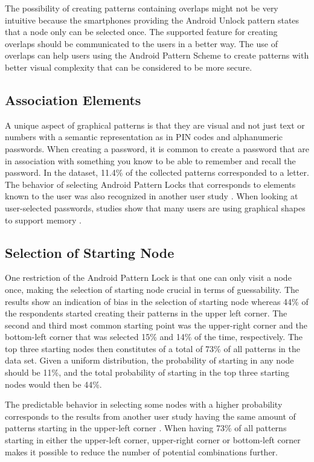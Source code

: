       The possibility of creating patterns containing overlaps might not be very intuitive because the smartphones providing the Android Unlock pattern states that a node only can be selected once. The supported feature for creating overlaps should be communicated to the users in a better way. The use of overlaps can help users using the Android Pattern Scheme to create patterns with better visual complexity that can be considered to be more secure.
    
    \clearpage
    \subsection{Association Elements}
      A unique aspect of graphical patterns is that they are visual and not just text or numbers with a semantic representation as in PIN codes and alphanumeric passwords. When creating a password, it is common to create a password that are in association with something you know to be able to remember and recall the password. In the dataset, 11.4\% of the collected patterns corresponded to a letter. The behavior of selecting Android Pattern Locks that corresponds to elements known to the user was also recognized in another user study \cite{Sun}. When looking at user-selected passwords, studies show that many users are using graphical shapes to support memory \cite{Weiss}.

    \subsection{Selection of Starting Node}

      One restriction of the Android Pattern Lock is that one can only visit a node once, making the selection of starting node crucial in terms of guessability. The results show an indication of bias in the selection of starting node whereas 44\% of the respondents started creating their patterns in the upper left corner. The second and third most common starting point was the upper-right corner and the bottom-left corner that was selected 15\% and 14\% of the time, respectively. The top three starting nodes then constitutes of a total of 73\% of all patterns in the data set. Given a uniform distribution, the probability of starting in any node should be 11\%, and the total probability of starting in the top three starting nodes would then be 44\%.

      The predictable behavior in selecting some nodes with a higher probability corresponds to the results from another user study having the same amount of patterns starting in the upper-left corner \cite{Uellenbeck}. When having 73\% of all patterns starting in either the upper-left corner, upper-right corner or bottom-left corner makes it possible to reduce the number of potential combinations further.

